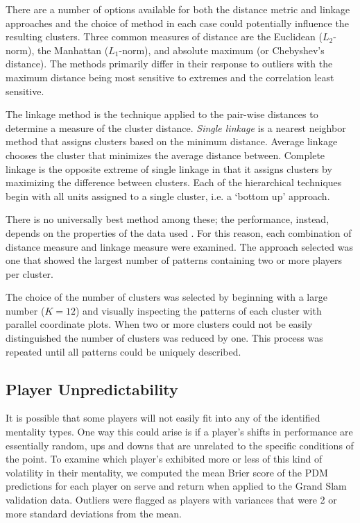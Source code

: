 \documentclass{Latex/svjour3}
\begin{document}
There are a number of options available for both the distance metric
and linkage approaches and the choice of method in each case could potentially influence
the resulting clusters. Three common measures of distance are the
Euclidean ($L_2$-norm), the Manhattan ($L_1$-norm), and absolute
maximum (or Chebyshev's distance). The methods primarily differ in
their response to outliers with the maximum distance being most
sensitive to extremes and the correlation least sensitive.  

The linkage method is the technique applied to the pair-wise distances
to determine a measure of the cluster distance. \textit{Single
  linkage} is a nearest neighbor method that assigns clusters based on
the minimum distance. Average linkage chooses the cluster that
minimizes the average distance between. Complete linkage is the
opposite extreme of single linkage in that it assigns clusters by
maximizing the difference between clusters. Each of the hierarchical
techniques begin with all units assigned to a single cluster, i.e. a
`bottom up' approach. 

There is no universally best method among these; the performance,
instead, depends on the properties of the data used
\cite{kumar2014performance}. For this reason, each
combination of distance measure and linkage measure were examined. The
approach selected was one that showed the largest number of patterns
containing two or more players per cluster. 

The choice of the number of clusters was selected by beginning with a
large number ($K = 12$) and visually inspecting the patterns of each
cluster with parallel coordinate plots. When two or more clusters
could not be easily distinguished the number of clusters was reduced
by one. This process was repeated until all patterns could be
uniquely described. 



\subsection{Player Unpredictability}

It is possible that some players will not easily fit into any of the
identified mentality types. One way this could arise is if a player's
shifts in performance are essentially random, ups and downs that are
unrelated to the specific conditions of the point. To examine which
player's exhibited more or less of this kind of volatility in their
mentality, we computed the mean Brier score of the PDM predictions for each player on serve and
return when applied to the Grand Slam validation data. Outliers were flagged
as players with variances that were 2 or more standard deviations from
the mean. 
\end{document}

